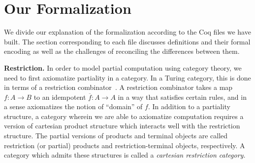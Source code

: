 \documentclass{entcs} \usepackage{entcsmacro}
\begin{document}
\section{Our Formalization}

%

We divide our explanation of the formalization according to the Coq
files we have built. The section corresponding to each file
discusses definitions and their formal encoding as well as the
challenges of reconciling the differences between them.

{\bfseries Restriction.} In order to model partial computation using category theory, we need to first axiomatize partiality in a category. In a Turing category, this is done in terms of a restriction combinator~\cite{Restriction}.
A restriction combinator takes a map $f : A \to B$ to an idempotent
$\overline{f} : A \to A$ in a way that satisfies certain rules, and
in a sense axiomatizes the notion of ``domain'' of $f$.
In addition to a partiality structure, a category wherein we are able to axiomatize computation requires a version of cartesian product structure which interacts well with the restriction structure. The partial versions of products and terminal objects are called restriction (or partial) products and restriction-terminal objects, respectively. A category which admits these structures is called a {\em cartesian restriction category.} 

\end{document}
